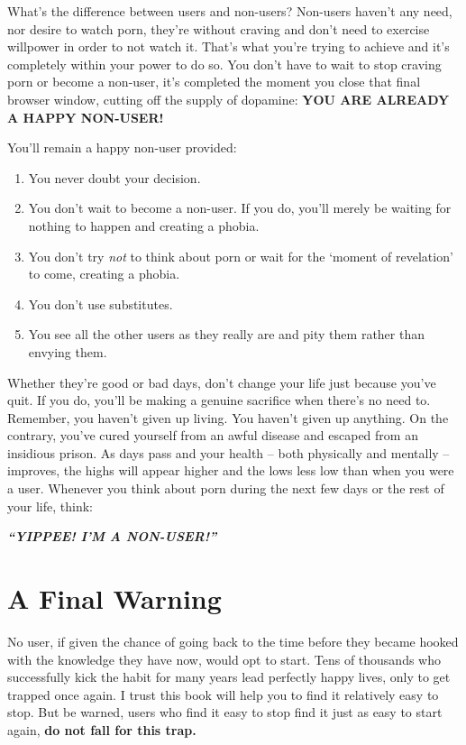 \documentclass[
]{book}
\begin{document}
What's the difference between users and non-users? Non-users haven't any need, nor desire to watch porn, they're without craving and don't need to exercise willpower in order to not watch it. That's what you're trying to achieve and it's completely within your power to do so. You don't have to wait to stop craving porn or become a non-user, it's completed the moment you close that final browser window, cutting off the supply of dopamine: \textbf{YOU ARE ALREADY A HAPPY NON-USER!}

You'll remain a happy non-user provided:

\begin{enumerate}
\def\labelenumi{\arabic{enumi}.}
\item
  You never doubt your decision.
\item
  You don't wait to become a non-user. If you do, you'll merely be waiting for nothing to happen and creating a phobia.
\item
  You don't try \emph{not} to think about porn or wait for the `moment of revelation' to come, creating a phobia.
\item
  You don't use substitutes.
\item
  You see all the other users as they really are and pity them rather than envying them.
\end{enumerate}

Whether they're good or bad days, don't change your life just because you've quit. If you do, you'll be making a genuine sacrifice when there's no need to. Remember, you haven't given up living. You haven't given up anything. On the contrary, you've cured yourself from an awful disease and escaped from an insidious prison. As days pass and your health -- both physically and mentally -- improves, the highs will appear higher and the lows less low than when you were a user. Whenever you think about porn during the next few days or the rest of your life, think:

\textbf{\emph{``YIPPEE! I'M A NON-USER!''}}

\hypertarget{a-final-warning}{%
\section{A Final Warning}\label{a-final-warning}}

No user, if given the chance of going back to the time before they became hooked with the knowledge they have now, would opt to start. Tens of thousands who successfully kick the habit for many years lead perfectly happy lives, only to get trapped once again. I trust this book will help you to find it relatively easy to stop. But be warned, users who find it easy to stop find it just as easy to start again, \textbf{do not fall for this trap.}
\end{document}

